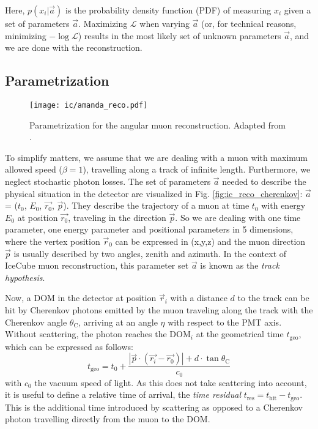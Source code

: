 Here, $p(x_i|\vec{a})$ is the probability density function (PDF) of measuring $x_i$ given a set of parameters $\vec{a}$. Maximizing $\mathcal{L}$ when varying $\vec{a}$ (or, for technical reasons, minimizing $-\log{\mathcal{L}}$) results in the most likely set of unknown parameters $\vec{a}$, and we are done with the reconstruction.

\subsection{Parametrization}
\begin{figure}[h!]
    \texttt{[image: ic/amanda\_reco.pdf]}
    \caption[Angular reconstruction in IceCube]{Parametrization for the angular muon reconstruction. Adapted from \cite{Ahrens2004}.}
\end{figure}

To simplify matters, we assume that we are dealing with a muon with maximum allowed speed ($\beta=1$), travelling along a track of infinite length. Furthermore, we neglect stochastic photon losses. The set of parameters $\vec{a}$ needed to describe the physical situation in the detector are visualized in Fig. \ref{fig:ic_reco_cherenkov}: $\vec{a}$ = ($t_0$, $E_0$, $\vec{r_0}$, $\vec{p}$). They describe the trajectory of a muon at time $t_0$ with energy $E_0$ at position $\vec{r_0}$, traveling in the direction $\vec{p}$. So we are dealing with one time parameter, one energy parameter and positional parameters in 5 dimensions, where the vertex position $\vec{r}_0$ can be expressed in (x,y,z) and the muon direction $\vec{p}$ is usually described by two angles, zenith and azimuth. In the context of IceCube muon reconstruction, this parameter set $\vec{a}$ is known as the \textit{track hypothesis}.

Now, a DOM in the detector at position $\vec{r}_i$ with a distance $d$ to the track can be hit by Cherenkov photons emitted by the muon traveling along the track with the Cherenkov angle $\theta_\text{C}$, arriving at an angle $\eta$ with respect to the PMT axis. Without scattering, the photon reaches the $\text{DOM}_i$ at the geometrical time $t_\text{geo}$, which can be expressed as follows:
\begin{equation}
t_\text{geo} = t_0 + \frac{|\vec{p}\cdot(\vec{r_i}-\vec{r_0})|+d\cdot \tan{\theta_\text{C}}}{c_0}
\end{equation}
with $c_0$ the vacuum speed of light. As this does not take scattering into account, it is useful to define a relative time of arrival, the \textit{time residual} $t_\text{res} = t_\text{hit} - t_\text{geo}$. This is the additional time introduced by scattering as opposed to a Cherenkov photon travelling directly from the muon to the DOM.

